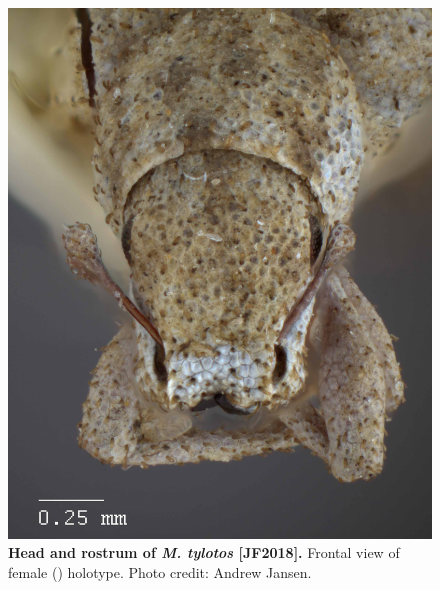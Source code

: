 \documentclass[fleqn,10pt,lineno]{wlpeerj} %
\begin{document}
\begin{figure}[h]
	\centering
	\includegraphics[width=\textwidth]{figure33.jpg}
	\caption{\textbf{Head and rostrum of \textit{M. tylotos} [JF2018].} Frontal view of female (\female) holotype. Photo credit: Andrew Jansen.}
	\label{fig:tylotos_F_frontal}
\end{figure}
\end{document}
